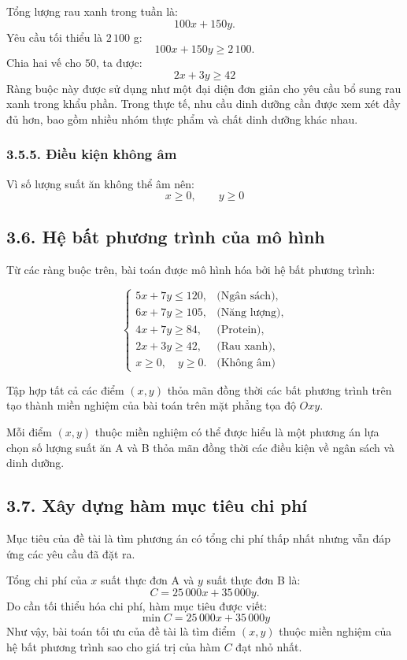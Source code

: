 \documentclass[12pt,a4paper]{article}
\begin{document}
Tổng lượng rau xanh trong tuần là:
\[
100x+150y.
\]
Yêu cầu tối thiểu là $2\,100$ g:
\[
100x+150y\geq2\,100.
\]
Chia hai vế cho $50$, ta được:
\[
\boxed{
2x+3y\geq42
}
\tag{4}
\]
Ràng buộc này được sử dụng như một đại diện đơn giản cho yêu cầu bổ sung rau xanh trong khẩu phần. Trong thực tế, nhu cầu dinh dưỡng cần được xem xét đầy đủ hơn, bao gồm nhiều nhóm thực phẩm và chất dinh dưỡng khác nhau.

\subsubsection*{3.5.5. Điều kiện không âm}

Vì số lượng suất ăn không thể âm nên:
\[
\boxed{
x\geq0,\qquad y\geq0
}
\tag{5}
\]

\subsection*{3.6. Hệ bất phương trình của mô hình}

Từ các ràng buộc trên, bài toán được mô hình hóa bởi hệ bất phương trình:

\[
\boxed{
\left\{
\begin{array}{ll}
5x+7y\leq120, & \text{(Ngân sách)},\\[4pt]
6x+7y\geq105, & \text{(Năng lượng)},\\[4pt]
4x+7y\geq84, & \text{(Protein)},\\[4pt]
2x+3y\geq42, & \text{(Rau xanh)},\\[4pt]
x\geq0,\quad y\geq0. & \text{(Không âm)}
\end{array}
\right.
}
\]

Tập hợp tất cả các điểm $(x,y)$ thỏa mãn đồng thời các bất phương trình trên tạo thành miền nghiệm của bài toán trên mặt phẳng tọa độ
$Oxy$.

Mỗi điểm $(x,y)$ thuộc miền nghiệm có thể được hiểu là một phương án lựa chọn số lượng suất ăn A và B thỏa mãn đồng thời các điều kiện về ngân sách và dinh dưỡng.

\subsection*{3.7. Xây dựng hàm mục tiêu chi phí}

Mục tiêu của đề tài là tìm phương án có tổng chi phí thấp nhất nhưng vẫn đáp ứng các yêu cầu đã đặt ra.

Tổng chi phí của $x$ suất thực đơn A và $y$ suất thực đơn B là:
\[
C=25\,000x+35\,000y.
\]
Do cần tối thiểu hóa chi phí, hàm mục tiêu được viết:
\[
\boxed{
\min C=25\,000x+35\,000y
}
\]
Như vậy, bài toán tối ưu của đề tài là tìm điểm $(x,y)$ thuộc miền nghiệm của hệ bất phương trình sao cho giá trị của hàm $C$ đạt nhỏ nhất.
\end{document}
